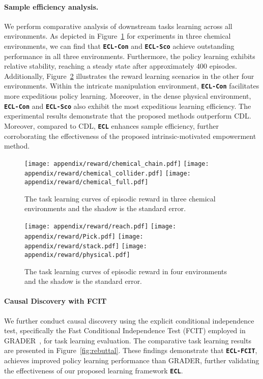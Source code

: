\paragraph{Sample efficiency analysis.}
We perform comparative analysis of downstream tasks learning across all environments. As depicted in Figure~\ref{fig:abl_reward_curve_chemical}  for experiments in three chemical environments, we can find that \texttt{\textbf{ECL-Con}} and \texttt{\textbf{ECL-Sco}} achieve outstanding performance in all three environments. Furthermore, the policy learning exhibits relative stability, reaching a steady state after approximately $400$ episodes. Additionally, Figure~\ref{fig:abl_reward_curve_other} illustrates the reward learning scenarios in the other four environments. 
Within the intricate manipulation environment, \texttt{\textbf{ECL-Con}} facilitates more expeditious policy learning. Moreover, in the dense physical environment, \texttt{\textbf{ECL-Con}} and \texttt{\textbf{ECL-Sco}} also exhibit the most expeditious learning efficiency. 
The experimental results demonstrate that the proposed methods outperform CDL. Moreover, compared to CDL, \texttt{\textbf{ECL}} enhances sample efficiency, further corroborating the effectiveness of the proposed intrinsic-motivated empowerment method. 

\begin{figure}[h]
    \centering
    \texttt{[image: appendix/reward/chemical\_chain.pdf]}
     \texttt{[image: appendix/reward/chemical\_collider.pdf]}
      \texttt{[image: appendix/reward/chemical\_full.pdf]}
   \caption{The task learning curves of episodic reward in three chemical environments and the shadow is the standard error.}
\label{fig:abl_reward_curve_chemical}
\end{figure}

\begin{figure}[h]
    \centering
    \texttt{[image: appendix/reward/reach.pdf]}
     \texttt{[image: appendix/reward/Pick.pdf]}
      \texttt{[image: appendix/reward/stack.pdf]}
      \texttt{[image: appendix/reward/physical.pdf]}
   \caption{The task learning curves of episodic reward in four environments and the shadow is the standard error.}
\label{fig:abl_reward_curve_other}
\end{figure}

\paragraph{Causal Discovery with FCIT} 
We further conduct causal discovery using the explicit conditional independence test, specifically the Fast Conditional Independence Test (FCIT) employed in GRADER~\citep{ding2022generalizing}, for task learning evaluation. The comparative task learning results are presented in Figure~\ref{fig:rebuttal}. These findings demonstrate that \texttt{\textbf{ECL-FCIT}}, achieves improved policy learning performance than GRADER, further validating the effectiveness of our proposed learning framework \texttt{\textbf{ECL}}. 

